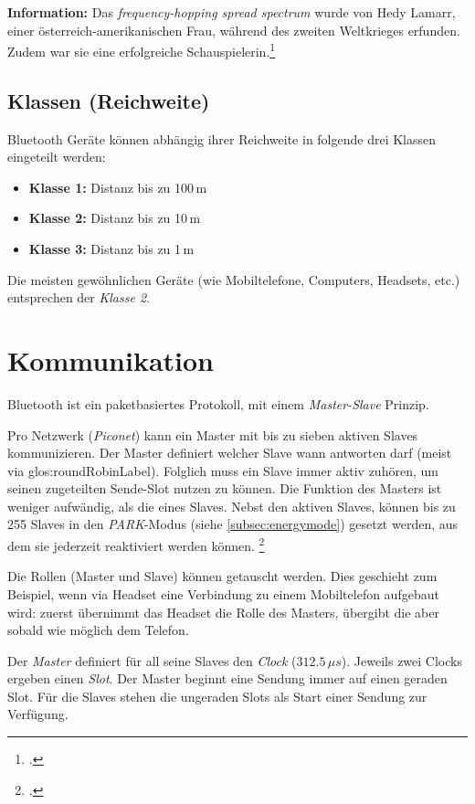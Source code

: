 \begin{framed}
	\textbf{Information:} Das \textit{frequency-hopping spread spectrum} wurde von Hedy Lamarr, einer österreich-amerikanischen Frau, während des zweiten Weltkrieges erfunden. Zudem war sie eine erfolgreiche Schauspielerin.\footcite{Hedy_Lamarr_Wikipedia_2015-04-27}
\end{framed}


\subsection{Klassen (Reichweite)}
Bluetooth Geräte können abhängig ihrer Reichweite in folgende drei Klassen eingeteilt werden:
\begin{itemize}
	\item \textbf{Klasse 1:} Distanz bis zu 100\,m
	\item \textbf{Klasse 2:} Distanz bis zu 10\,m
	\item \textbf{Klasse 3:} Distanz bis zu 1\,m
\end{itemize}
Die meisten gewöhnlichen Geräte (wie Mobiltelefone, Computers, Headsets, etc.) entsprechen der \textit{Klasse 2}.



\section{Kommunikation}
Bluetooth ist ein paketbasiertes Protokoll, mit einem \textit{Master-Slave} Prinzip.

Pro Netzwerk (\textit{Piconet}) kann ein Master mit bis zu sieben aktiven Slaves kommunizieren.
Der Master definiert welcher Slave wann antworten darf (meist via \gls{glos:roundRobinLabel}).
Folglich muss ein Slave immer aktiv zuhören, um seinen zugeteilten Sende-Slot nutzen zu können. Die Funktion des Masters ist weniger aufwändig, als die eines Slaves.
Nebst den aktiven Slaves, können bis zu 255 Slaves in den \textit{PARK}-Modus (siehe \cref{subsec:energymode}) gesetzt werden, aus dem sie jederzeit reaktiviert werden können.
\footcite{Piconet_-_Wikipedia_2015-04-18}


Die Rollen (Master und Slave) können getauscht werden.
Dies geschieht zum Beispiel, wenn via Headset eine Verbindung zu einem Mobiltelefon aufgebaut wird:
zuerst übernimmt das Headset die Rolle des Masters, übergibt die aber sobald wie möglich dem Telefon.

Der \textit{Master} definiert für all seine Slaves den \textit{Clock} ($312.5\,\mu s$).
Jeweils zwei Clocks ergeben einen \textit{Slot}.
Der Master beginnt eine Sendung immer auf einen geraden Slot.
Für die Slaves stehen die ungeraden Slots als Start einer Sendung zur Verfügung.

